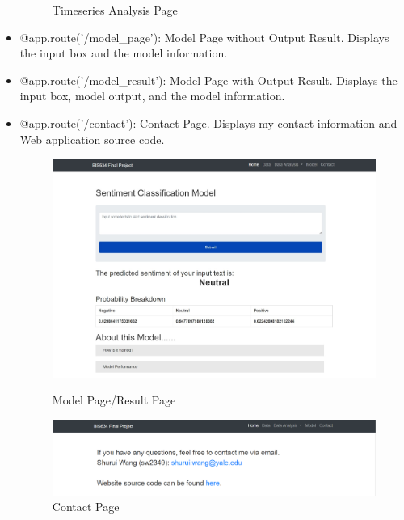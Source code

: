 \documentclass{article}
\begin{document}
\begin{itemize}
\begin{figure}[H]
\begin{minipage}[H]{.5\textwidth}
      \caption{Timeseries Analysis Page}
    \end{minipage}
    \end{figure}
    \item @app.route('/model\_page'): Model Page without Output Result. Displays the input box and the model information.
    \item @app.route('/model\_result'): Model Page with Output Result. Displays the input box, model output, and the model information.
    \item @app.route('/contact'): Contact Page. Displays my contact information and Web application source code.
    \begin{figure}[H]
    \centering
    \begin{minipage}[H]{.5\textwidth}
      \centering
      \includegraphics[width=\linewidth]{ModelPageWithInput.jpeg}
      \caption{Model Page/Result Page}
      \label{fig:sub1}
    \end{minipage}%
    \begin{minipage}[H]{.5\textwidth}
      \centering
      \includegraphics[width=\linewidth]{ContactPage.png}
      \caption{Contact Page}
      \label{fig:sub2}
    \end{minipage}
    \end{figure}
\end{itemize}
\end{document}
